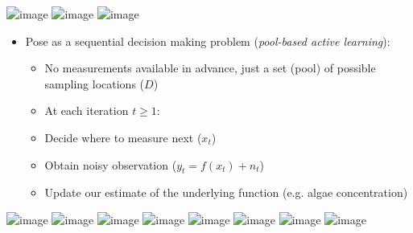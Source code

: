 \documentclass[10pt,mathserif,serif,handout]{beamer}
\begin{document}
\begin{frame}
\begin{center}
\vspace{0.2in}
\includegraphics<1>[width=4.7in]{figures/limno_bgape_sc}
\includegraphics<2>[width=4.7in]{figures/limno_bgape}
\includegraphics<3>[width=4.7in]{figures/limno_bgape_ls}
\end{center}
\end{frame}

\begin{frame}
\begin{itemize}
\item<1-> Pose as a sequential decision making problem (\emph{pool-based active learning}):
\begin{itemize}
\item<2-> No measurements available in advance, just a set (pool) of possible sampling locations ($D$)
\vspace{0.5em}
\item<3->[]\hspace{-1.5em} At each iteration $t \geq 1$:
\item<3-> Decide where to measure next ($x_t$)
\item<4-> Obtain noisy observation ($y_t = f(x_t) + n_t$)
\item<5-> Update our estimate of the underlying function (e.g. algae concentration)
\end{itemize}
\end{itemize}
\begin{center}
\color{white}
\includegraphics<1>[draft,width=4.45in]{figures/oned_0}
\color{black}
\includegraphics<2>[width=4.45in]{figures/oned_0}
\includegraphics<3>[width=4.45in]{figures/oned_1_0}
\includegraphics<4>[width=4.45in]{figures/oned_1_1}
\includegraphics<5>[width=4.45in]{figures/oned_1_2}
\includegraphics<6>[width=4.45in]{figures/oned_2_0}
\includegraphics<7>[width=4.45in]{figures/oned_2_1}
\includegraphics<8>[width=4.45in]{figures/oned_2_2}
\end{center}
\end{frame}
\end{document}
